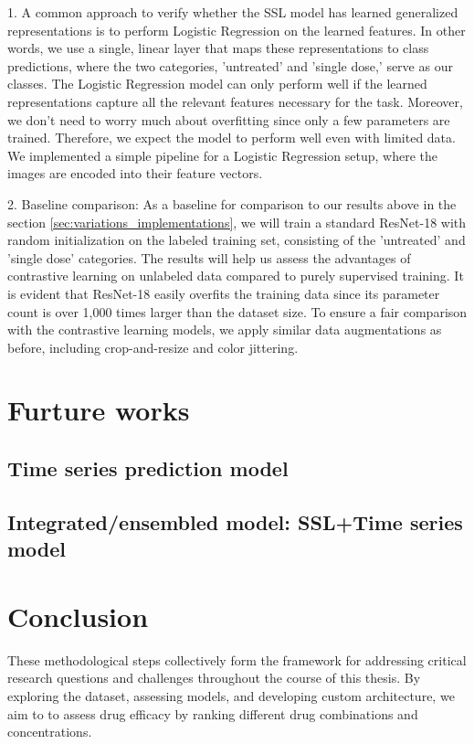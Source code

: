 \documentclass[12pt,twoside,a4paper,parskip]{scrbook} %
\begin{document}
1. A common approach to verify whether the SSL model has learned generalized representations is to perform Logistic Regression on the learned features. In other words, we use a single, linear layer that maps these representations to class predictions, where the two categories, 'untreated' and 'single dose,' serve as our classes. The Logistic Regression model can only perform well if the learned representations capture all the relevant features necessary for the task. Moreover, we don't need to worry much about overfitting since only a few parameters are trained. Therefore, we expect the model to perform well even with limited data. We implemented a simple pipeline for a Logistic Regression setup, where the images are encoded into their feature vectors.

2. Baseline comparison: As a baseline for comparison  to our results above in the section \ref{sec:variations_implementations}, we will train a standard ResNet-18 with random initialization on the labeled training set, consisting of the 'untreated' and 'single dose' categories. The results will help us assess the advantages of contrastive learning on unlabeled data compared to purely supervised training. It is evident that ResNet-18 easily overfits the training data since its parameter count is over 1,000 times larger than the dataset size. To ensure a fair comparison with the contrastive learning models, we apply similar data augmentations as before, including crop-and-resize and color jittering.


\chapter{Furture works}\label{ch:Furture works}
\section{Time series prediction model}
\section{Integrated/ensembled model: SSL+Time series model}
\chapter{Conclusion}\label{ch:Conclusion}

These methodological steps collectively form the framework for addressing critical research questions and challenges throughout the course of this thesis. By exploring the dataset, assessing models, and developing custom architecture, we aim to to assess drug efficacy by ranking different drug combinations and concentrations.
\end{document}
